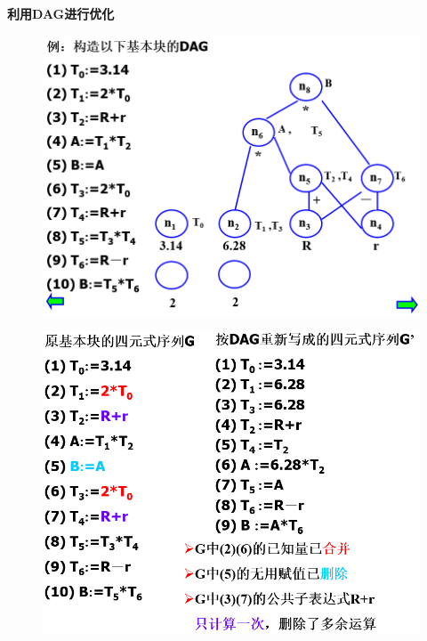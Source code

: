 \documentclass[UTF8,a4paper]{ctexart}
\begin{document}
\textbf{利用DAG进行优化}
\begin{figure}[H]
 \centering
 \includegraphics[scale = 0.3]{assets/CompilerConstructionPrinciples_723f0.png}
\end{figure}

\begin{figure}[H]
 \centering
 \includegraphics[scale = 0.3]{assets/CompilerConstructionPrinciples_e4017.png}
\end{figure}
\end{document}
